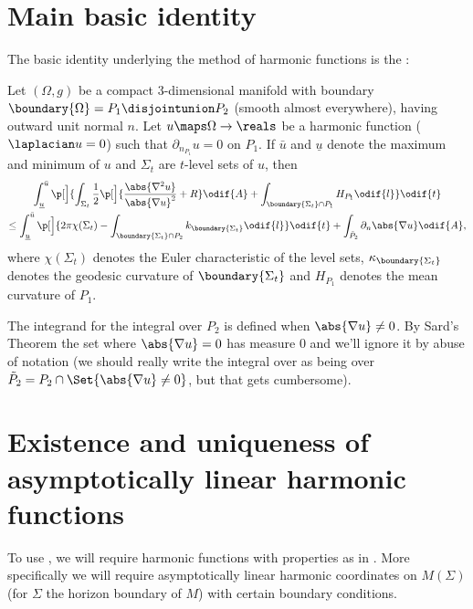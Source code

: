 \documentclass[titlepage,numbers=noenddot,headinclude,oneside,%
footinclude=true,cleardoublepage=empty,%
BCOR=5mm,paper=a4,fontsize=11pt,%
english,%
]{scrartcl}
\begin{document}
\section{Main basic identity}
The basic identity underlying the method of harmonic functions is the \cite[Proposition 4.2]{brayHarmonicFunctionsMass2019}:
{\newcommand{\maxu}{\bar{u}}
\newcommand{\minu}{\underline{u}}
\newcommand{\nonzeroboundary}{\partial_{\neq 0}\Omega}
\begin{proposition}\label{prop:main_identity}
    Let \( (\Omega,g) \) be a compact 3-dimensional manifold with boundary \( \boundary{\Omega}=P_1\disjointunion P_2 \) (smooth almost everywhere), having outward unit normal \( n \). Let \( u\maps \Omega\to \reals \) be a harmonic function (\ie \( \laplacian u=0 \)) such that \( \partial_{n_{P_1}}u=0 \) on \( P_1 \). If \( \maxu \) and \( \minu \) denote the maximum and minimum of \( u \) and \( \Sigma_t \) are \( t \)-level sets of \( u \), then
    \begin{multline*}
        \int_{\minu}^{\maxu} \p[\Big]{\int_{\Sigma_t} \frac{1}{2}\p[\Big]{\frac{\abs{\nabla^2 u}}{\abs{\nabla u}^2}+R }\odif{A}+\int_{\boundary{\Sigma_t}\cap P_1}H_{P_1}\odif{l}}\odif{t}\\
        \leq\int_{\minu}^{\maxu}\p[\Big]{2\pi \chi(\Sigma_t)-\int _{\boundary{\Sigma_t} \cap P_2}k_{\boundary{\Sigma_t}}\odif{l}}\odif{t}+ \int_{\tilde{P}_2}\partial_{n} \abs{\nabla u}\odif{A},
    \end{multline*} 
    where \( \chi(\Sigma_t) \) denotes the Euler characteristic of the level sets, \( \kappa_{\boundary{\Sigma_t}} \) denotes the geodesic curvature of \( \boundary{\Sigma_t} \) and \( H_{P_1} \) denotes the mean curvature of \( P_1 \).

    The integrand for the integral over \( P_2 \) is defined when \( \abs{\nabla u}\neq 0 \). By Sard's Theorem \parencite{sardMeasureCriticalValues1942} the set where \( \abs{\nabla u}=0 \) has measure \( 0 \) and we'll ignore it by abuse of notation (we should really write the integral over as being over \( \tilde{P}_2=P_2\cap \Set{\abs{\nabla u}\neq 0} \), but that gets cumbersome).
\end{proposition}
}
\section{Existence and uniqueness of asymptotically linear harmonic functions}
To use , we will require harmonic functions with properties as in . More specifically we will require asymptotically linear harmonic coordinates on \( M(\Sigma) \) (for \( \Sigma \) the horizon boundary of \( M \)) with certain boundary conditions.
\end{document}
